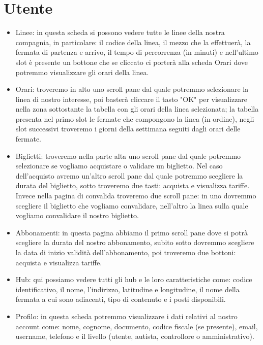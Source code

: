 \documentclass[12pt,a4paper]{report}
\begin{document}
\section{Utente}
\begin{itemize}
    \item Linee: in questa scheda si possono vedere tutte le linee della nostra compagnia, in particolare: il codice della linea, il mezzo che la effettuerà, la fermata di partenza e arrivo, il tempo di percorrenza (in minuti) e nell'ultimo slot è presente un bottone che se cliccato ci porterà alla scheda Orari dove potremmo visualizzare gli orari della linea.
    \item Orari:  troveremo in alto uno scroll pane dal quale potremmo selezionare la linea di nostro interesse, poi basterà cliccare il tasto "OK" per visualizzare nella zona sottostante la tabella con gli orari della linea selezionata; la tabella presenta nel primo slot le fermate che compongono la linea (in ordine), negli slot successivi troveremo i giorni della settimana seguiti dagli orari delle fermate.
    \item Biglietti: troveremo nella parte alta uno scroll pane dal quale potremmo selezionare se vogliamo acquistare o validare un biglietto. Nel caso dell'acquisto avremo un'altro scroll pane dal quale potremmo scegliere la durata del biglietto, sotto troveremo due tasti: acquista e visualizza tariffe.\\ Invece nella pagina di convalida troveremo due scroll pane: in uno dovremmo scegliere il biglietto che vogliamo convalidare, nell'altro la linea sulla quale vogliamo convalidare il nostro biglietto.
    \item Abbonamenti: in questa pagina abbiamo il primo scroll pane dove si potrà scegliere la durata del nostro abbonamento, subito sotto dovremmo scegliere la data di inizio validità dell'abbonamento,
    poi troveremo due bottoni: acquista e visualizza tariffe.
    \item Hub: qui possiamo vedere tutti gli hub e le loro caratteristiche come: codice identificativo, il nome, l'indirizzo, latitudine e longitudine, il nome della fermata a cui sono adiacenti, tipo di contenuto e i posti disponibili.
    \item Profilo: in questa scheda potremmo visualizzare i dati relativi al nostro account come: nome, cognome, documento, codice fiscale (se presente), email, username, telefono e il livello (utente, autista, controllore o amministrativo).
\end{itemize}
\end{document}
